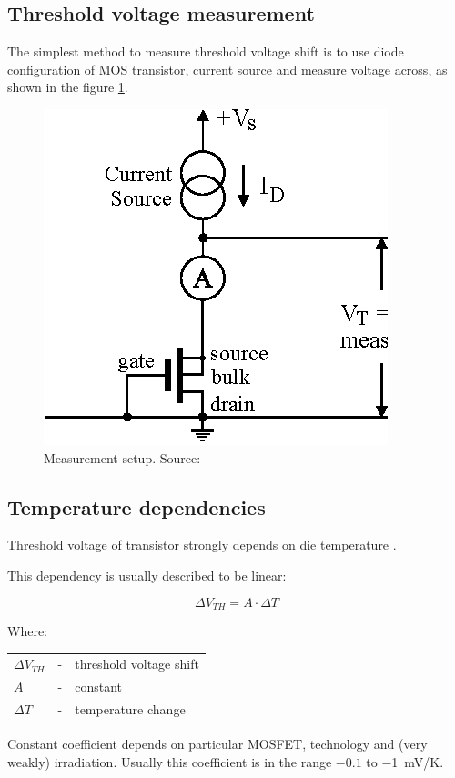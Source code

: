     \subsection{Threshold voltage measurement}
        The simplest method to measure threshold voltage shift is to use diode configuration of MOS transistor, current source and measure voltage across, as shown in the figure \ref{MOS_measurement_setup}.

        \begin{figure}[H]
            \centering
            \includegraphics[width=0.3\paperwidth]{img/03/Vth-measurement-setup.eps}
            \caption{Measurement setup. Source: \cite{pMOS_dosimeters_radfets}}
            \label{MOS_measurement_setup}
        \end{figure}

    \subsection{Temperature dependencies}
        Threshold voltage of transistor strongly depends on die temperature \cite{managing_temperature_effects_in_nanoscale_adaptive_systems}.

        This dependency is usually described to be linear:

        $$\Delta V_{TH} = A \cdot \Delta T$$

        Where:

        \begin{tabular}{lcl}
            $\Delta V_{TH}$ & - & threshold voltage shift \\
            $A$ & - & constant \\
            $\Delta T$ & - & temperature change \\
        \end{tabular}
        \bigskip

        Constant coefficient depends on particular MOSFET, technology and (very weakly) irradiation. Usually this coefficient is in the range $-0.1$ to \SI{-1}{\milli\volt/\kelvin}.
